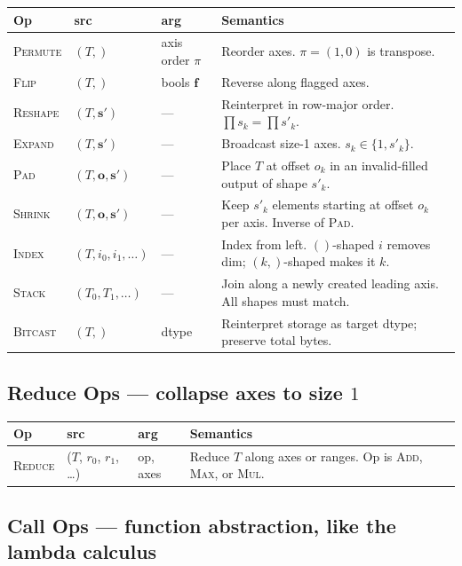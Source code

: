 \documentclass[10pt,letterpaper]{article}
\newcommand{\op}[1]{\textsc{#1}}
\begin{document}
\begin{tabular}{@{}l l l l@{}}
\toprule
\textbf{Op} & \textbf{src} & \textbf{arg} & \textbf{Semantics} \\
\midrule
\op{Permute} & $(T,)$ & axis order $\pi$ & Reorder axes. $\pi = (1,0)$ is transpose. \\
\op{Flip} & $(T,)$ & bools $\mathbf{f}$ & Reverse along flagged axes. \\
\op{Reshape} & $(T, \mathbf{s'})$ & --- & Reinterpret in row-major order. $\prod s_k = \prod s'_k$. \\
\op{Expand} & $(T, \mathbf{s'})$ & --- & Broadcast size-1 axes. $s_k \in \{1, s'_k\}$. \\
\op{Pad} & $(T, \mathbf{o}, \mathbf{s'})$ & --- & Place $T$ at offset $o_k$ in an invalid-filled output of shape $s'_k$. \\
\op{Shrink} & $(T, \mathbf{o}, \mathbf{s'})$ & --- & Keep $s'_k$ elements starting at offset $o_k$ per axis. Inverse of \op{Pad}. \\
\op{Index} & $(T, i_0, i_1, \ldots)$ & --- & Index from left. $()$-shaped $i$ removes dim; $(k,)$-shaped makes it $k$. \\
\op{Stack} & $(T_0, T_1, \ldots)$ & --- & Join along a newly created leading axis. All shapes must match. \\
\op{Bitcast} & $(T,)$ & dtype & Reinterpret storage as target dtype; preserve total bytes. \\
\bottomrule
\end{tabular}

\subsection*{{\color{reducered}Reduce Ops} \normalfont\small--- collapse axes to size $1$}

\begin{tabular}{@{}l l l l@{}}
\toprule
\textbf{Op} & \textbf{src} & \textbf{arg} & \textbf{Semantics} \\
\midrule
\op{Reduce} & ($T$, $r_0$, $r_1$, \ldots) & op, axes & Reduce $T$ along axes or ranges. Op is \op{Add}, \op{Max}, or \op{Mul}. \\
\bottomrule
\end{tabular}

\subsection*{{\color{callblue}Call Ops} \normalfont\small--- function abstraction, like the lambda calculus}
\end{document}
